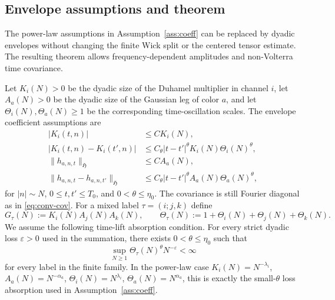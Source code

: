 \documentclass[11pt,reqno]{amsart}
\numberwithin{equation}{section}
\theoremstyle{plain}
\theoremstyle{definition}
\newcommand{\eps}{\varepsilon}
\begin{document}
\subsection{Envelope assumptions and theorem}

The power-law assumptions in Assumption~\ref{ass:coeff} can be replaced by dyadic envelopes without changing the finite Wick split or the centered tensor estimate.  The resulting theorem allows frequency-dependent amplitudes and non-Volterra time covariance.

Let \(K_i(N)>0\) be the dyadic size of the Duhamel multiplier in channel \(i\), let \(A_a(N)>0\) be the dyadic size of the Gaussian leg of color \(a\), and let \(\Theta_i(N),\Theta_a(N)\ge1\) be the corresponding time-oscillation scales.  The envelope coefficient assumptions are
\begin{align}
        |K_i(t,n)|&\le C K_i(N), \label{eq:env-K}\\
        |K_i(t,n)-K_i(t',n)|&\le C_\theta |t-t'|^\theta K_i(N)\Theta_i(N)^\theta, \label{eq:env-K-increment}\\
        \|h_{a,n,t}\|_{\mathfrak H}&\le C A_a(N), \label{eq:env-A}\\
        \|h_{a,n,t}-h_{a,n,t'}\|_{\mathfrak H}&\le C_\theta |t-t'|^\theta A_a(N)\Theta_a(N)^\theta, \label{eq:env-A-increment}
\end{align}
for \(|n|\sim N\), \(0\le t,t'\le T_0\), and \(0<\theta\le\eta_0\).  The covariance is still Fourier diagonal as in \eqref{eq:conv-cov}.  For a mixed label \(\tau=(i;j,k)\) define
\begin{equation}\label{eq:env-GTheta}
        G_\tau(N):=K_i(N)A_j(N)A_k(N),
        \qquad
        \Theta_\tau(N):=1+\Theta_i(N)+\Theta_j(N)+\Theta_k(N).
\end{equation}
We assume the following time-lift absorption condition.  For every strict dyadic loss \(\eps>0\) used in the summation, there exists \(0<\theta\le\eta_0\) such that
\begin{equation}\label{eq:time-lift-absorb}
        \sup_{N\ge1}\Theta_\tau(N)^\theta N^{-\eps}<\infty
\end{equation}
for every label in the finite family.  In the power-law case \(K_i(N)=N^{-\lambda_i}\), \(A_a(N)=N^{-\alpha_a}\), \(\Theta_i(N)=N^{\lambda_i}\), \(\Theta_a(N)=N^{\alpha_a}\), this is exactly the small-\(\theta\) loss absorption used in Assumption~\ref{ass:coeff}.
\end{document}
